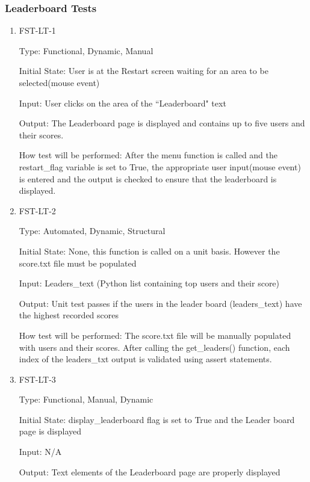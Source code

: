 \documentclass[12pt, titlepage]{article}
\begin{document}
\subsubsection{Leaderboard Tests}

\begin{enumerate}

\item{FST-LT-1\\}

Type: Functional, Dynamic, Manual
					
Initial State: User is at the Restart screen waiting for an area to be selected(mouse event)
					
Input: User clicks on the area of the ``Leaderboard" text
					
Output: The Leaderboard page is displayed and contains up to five users and their scores.
					
How test will be performed: After the menu function is called and the restart\_flag variable is set to True, the appropriate user input(mouse event) is entered and the output is checked to ensure that the leaderboard is displayed. 
					

\item{FST-LT-2\\}

Type: Automated, Dynamic, Structural
					
Initial State: None, this function is called on a unit basis. However the score.txt file must be populated
					
Input: Leaders\_text (Python list containing top users and their score)
					
Output: Unit test passes if the users in the leader board (leaders\_text) have the highest recorded scores
					
How test will be performed: The score.txt file will be manually populated with users and their scores. After calling the get\_leaders() function, each index of the leaders\_txt output is validated using assert statements.

\item{FST-LT-3\\}

Type: Functional, Manual, Dynamic 
					
Initial State: display\_leaderboard flag is set to True and the Leader board page is displayed
					
Input: N/A
					
Output: Text elements of the Leaderboard page are properly displayed
					

\end{enumerate}
\end{document}
